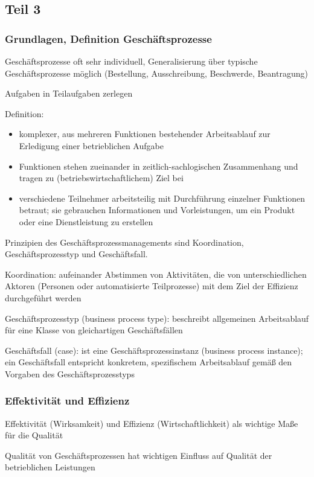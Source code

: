 \subsection{Teil 3}
\subsubsection{Grundlagen, Definition Geschäftsprozesse}
Geschäftsprozesse oft sehr individuell, Generalisierung über typische Geschäftsprozesse möglich (Bestellung, Ausschreibung, Beschwerde, Beantragung)
\par
Aufgaben in Teilaufgaben zerlegen
\par
Definition:
\begin{itemize}
  \item komplexer, aus mehreren Funktionen bestehender Arbeitsablauf zur Erledigung einer betrieblichen Aufgabe
  \item Funktionen stehen zueinander in zeitlich-sachlogischen Zusammenhang und tragen zu (betriebswirtschaftlichem) Ziel bei
  \item verschiedene Teilnehmer arbeitsteilig mit Durchführung einzelner Funktionen betraut; sie gebrauchen Informationen und Vorleistungen, um ein Produkt oder eine Dienstleistung zu erstellen
\end{itemize}
Prinzipien des Geschäftsprozessmanagements sind Koordination, Geschäftsprozesstyp und Geschäftsfall.
\par
Koordination: aufeinander Abstimmen von Aktivitäten, die von unterschiedlichen Aktoren (Personen oder automatisierte Teilprozesse) mit dem Ziel der Effizienz durchgeführt werden
\par
Geschäftsprozesstyp (business process type): beschreibt allgemeinen Arbeitsablauf für eine Klasse von gleichartigen Geschäftsfällen
\par
Geschäftsfall (case): ist eine Geschäftsprozessinstanz (business process instance); ein Geschäftsfall entspricht konkretem, spezifischem Arbeitsablauf gemäß den Vorgaben des Geschäftsprozesstyps
\par

\subsubsection{Effektivität und Effizienz}
Effektivität (Wirksamkeit) und Effizienz (Wirtschaftlichkeit) als wichtige Maße für die Qualität
\par
Qualität von Geschäftsprozessen hat wichtigen Einfluss auf Qualität der betrieblichen Leistungen

